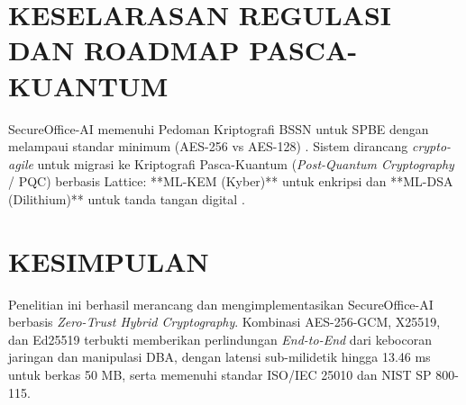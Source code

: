 \documentclass[conference]{IEEEtran}
\begin{document}
\section{KESELARASAN REGULASI DAN ROADMAP PASCA-KUANTUM}
SecureOffice-AI memenuhi Pedoman Kriptografi BSSN untuk SPBE dengan melampaui standar minimum (AES-256 vs AES-128) \cite{bssn2022spbe}. Sistem dirancang \textit{crypto-agile} untuk migrasi ke Kriptografi Pasca-Kuantum (\textit{Post-Quantum Cryptography} / PQC) berbasis Lattice: **ML-KEM (Kyber)** untuk enkripsi dan **ML-DSA (Dilithium)** untuk tanda tangan digital \cite{nistpqc2024}.

\section{KESIMPULAN}
Penelitian ini berhasil merancang dan mengimplementasikan SecureOffice-AI berbasis \textit{Zero-Trust Hybrid Cryptography}. Kombinasi AES-256-GCM, X25519, dan Ed25519 terbukti memberikan perlindungan \textit{End-to-End} dari kebocoran jaringan dan manipulasi DBA, dengan latensi sub-milidetik hingga 13.46 ms untuk berkas 50 MB, serta memenuhi standar ISO/IEC 25010 dan NIST SP 800-115.
\end{document}
